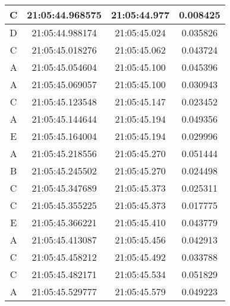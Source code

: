 \begin{longtable}{|ccc|c|}
    \multicolumn{1}{|c|}{C}    & \multicolumn{1}{c|}{21:05:44.968575} & 21:05:44.977       & 0.008425      \\ \hline
    \multicolumn{1}{|c|}{D}    & \multicolumn{1}{c|}{21:05:44.988174} & 21:05:45.024       & 0.035826      \\ \hline
    \multicolumn{1}{|c|}{C}    & \multicolumn{1}{c|}{21:05:45.018276} & 21:05:45.062       & 0.043724      \\ \hline
    \multicolumn{1}{|c|}{A}    & \multicolumn{1}{c|}{21:05:45.054604} & 21:05:45.100       & 0.045396      \\ \hline
    \multicolumn{1}{|c|}{A}    & \multicolumn{1}{c|}{21:05:45.069057} & 21:05:45.100       & 0.030943      \\ \hline
    \multicolumn{1}{|c|}{C}    & \multicolumn{1}{c|}{21:05:45.123548} & 21:05:45.147       & 0.023452      \\ \hline
    \multicolumn{1}{|c|}{A}    & \multicolumn{1}{c|}{21:05:45.144644} & 21:05:45.194       & 0.049356      \\ \hline
    \multicolumn{1}{|c|}{E}    & \multicolumn{1}{c|}{21:05:45.164004} & 21:05:45.194       & 0.029996      \\ \hline
    \multicolumn{1}{|c|}{A}    & \multicolumn{1}{c|}{21:05:45.218556} & 21:05:45.270       & 0.051444      \\ \hline
    \multicolumn{1}{|c|}{B}    & \multicolumn{1}{c|}{21:05:45.245502} & 21:05:45.270       & 0.024498      \\ \hline
    \multicolumn{1}{|c|}{C}    & \multicolumn{1}{c|}{21:05:45.347689} & 21:05:45.373       & 0.025311      \\ \hline
    \multicolumn{1}{|c|}{C}    & \multicolumn{1}{c|}{21:05:45.355225} & 21:05:45.373       & 0.017775      \\ \hline
    \multicolumn{1}{|c|}{E}    & \multicolumn{1}{c|}{21:05:45.366221} & 21:05:45.410       & 0.043779      \\ \hline
    \multicolumn{1}{|c|}{A}    & \multicolumn{1}{c|}{21:05:45.413087} & 21:05:45.456       & 0.042913      \\ \hline
    \multicolumn{1}{|c|}{C}    & \multicolumn{1}{c|}{21:05:45.458212} & 21:05:45.492       & 0.033788      \\ \hline
    \multicolumn{1}{|c|}{C}    & \multicolumn{1}{c|}{21:05:45.482171} & 21:05:45.534       & 0.051829      \\ \hline
    \multicolumn{1}{|c|}{A}    & \multicolumn{1}{c|}{21:05:45.529777} & 21:05:45.579       & 0.049223      \\ \hline

\end{longtable}
